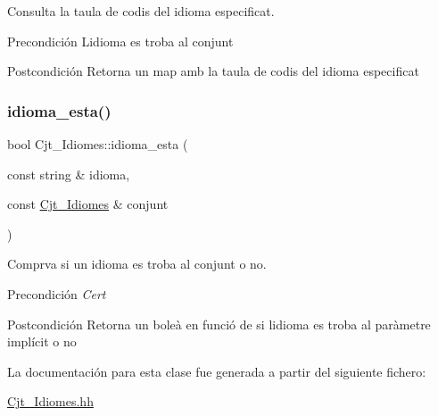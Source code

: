 Consulta la taula de codis del idioma especificat. 

\begin{DoxyPrecond}{Precondición}
L\textquotesingle{}idioma es troba al conjunt 
\end{DoxyPrecond}
\begin{DoxyPostcond}{Postcondición}
Retorna un map amb la taula de codis del idioma especificat 
\end{DoxyPostcond}
\mbox{\label{class_cjt___idiomes_a699b46fae0fb902952cc5cad27604928}} 
\subsubsection{\texorpdfstring{idioma\+\_\+esta()}{idioma\_esta()}}
{\footnotesize\ttfamily bool Cjt\+\_\+\+Idiomes\+::idioma\+\_\+esta (\begin{DoxyParamCaption}\item[{const string \&}]{idioma,  }\item[{const \hyperlink{class_cjt___idiomes}{Cjt\+\_\+\+Idiomes} \&}]{conjunt }\end{DoxyParamCaption})}



Comprva si un idioma es troba al conjunt o no. 

\begin{DoxyPrecond}{Precondición}
{\itshape Cert} 
\end{DoxyPrecond}
\begin{DoxyPostcond}{Postcondición}
Retorna un boleà en funció de si l\textquotesingle{}idioma es troba al paràmetre implícit o no 
\end{DoxyPostcond}


La documentación para esta clase fue generada a partir del siguiente fichero\+:\begin{DoxyCompactItemize}
\item 
\hyperlink{_cjt___idiomes_8hh}{Cjt\+\_\+\+Idiomes.\+hh}\end{DoxyCompactItemize}

